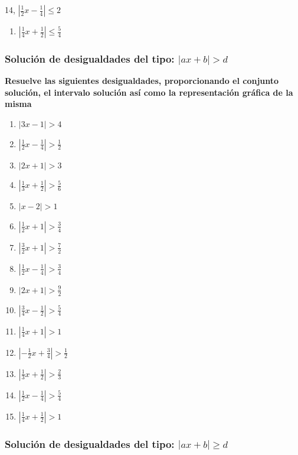 \documentclass[12pt]{article}
\providecommand{\tightlist}{\setlength{\itemsep}{0pt}\setlength{\parskip}{0pt}}
\begin{document}
14, \(|\frac{1}{2}x-\frac{1}{4}|\leq 2\)

\begin{enumerate}
\def\labelenumi{\arabic{enumi}.}
\setcounter{enumi}{14}
\tightlist
\item
  \(|\frac{1}{4}x+\frac{1}{2}|\leq \frac{5}{4}\)
\end{enumerate}

\subsubsection{\texorpdfstring{Solución de desigualdades del tipo:
\(|ax+b| >d\)}{Solución de desigualdades del tipo: \textbar ax+b\textbar{} \textgreater d}}\label{soluciuxf3n-de-desigualdades-del-tipo-axb-d-1}

\textbf{Resuelve las siguientes desigualdades, proporcionando el
conjunto solución, el intervalo solución así como la representación
gráfica de la misma}

\begin{enumerate}
\def\labelenumi{\arabic{enumi}.}
\item
  \(|3x-1|>4\)
\item
  \(|\frac{1}{2}x-\frac{1}{4}|>\frac{1}{2}\)
\item
  \(|2x+1|>3\)
\item
  \(|\frac{1}{3}x+\frac{1}{2}|>\frac{5}{6}\)
\item
  \(|x-2|>1\)
\item
  \(|\frac{1}{2}x+1|>\frac{3}{4}\)
\item
  \(|\frac{3}{2}x+1|>\frac{7}{2}\)
\item
  \(|\frac{1}{2}x-\frac{1}{4}|>\frac{3}{4}\)
\item
  \(|2x+1|>\frac{9}{2}\)
\item
  \(|\frac{3}{4}x-\frac{1}{2}|>\frac{5}{4}\)
\item
  \(|\frac{1}{4}x+1|>1\)
\item
  \(|-\frac{1}{2}x+\frac{3}{4}|>\frac{1}{2}\)
\item
  \(|\frac{1}{3}x+\frac{1}{2}|>\frac{2}{3}\)
\item
  \(|\frac{1}{2}x-\frac{1}{4}|>\frac{5}{4}\)
\item
  \(|\frac{1}{4}x+\frac{1}{2}|>1\)
\end{enumerate}

\subsubsection{\texorpdfstring{Solución de desigualdades del tipo:
\(|ax+b| \geq d\)}{Solución de desigualdades del tipo: \textbar ax+b\textbar{} \textbackslash geq d}}\label{soluciuxf3n-de-desigualdades-del-tipo-axb-geq-d}
\end{document}
